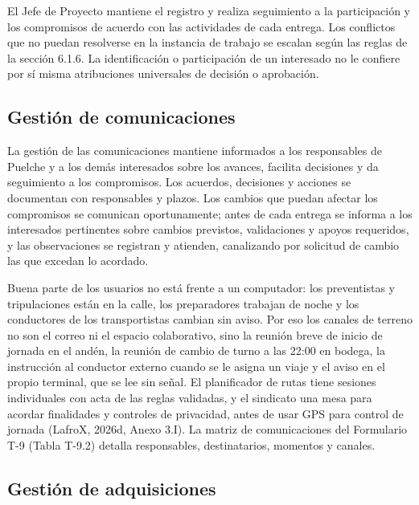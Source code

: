 El Jefe de Proyecto mantiene el registro y realiza seguimiento a la participación y los compromisos de acuerdo con las actividades de cada entrega. Los conflictos que no puedan resolverse en la instancia de trabajo se escalan según las reglas de la sección 6.1.6. La identificación o participación de un interesado no le confiere por sí misma atribuciones universales de decisión o aprobación.

\subsection{Gestión de comunicaciones}

La gestión de las comunicaciones mantiene informados a los responsables de Puelche y a los demás interesados sobre los avances, facilita decisiones y da seguimiento a los compromisos. Los acuerdos, decisiones y acciones se documentan con responsables y plazos. Los cambios que puedan afectar los compromisos se comunican oportunamente; antes de cada entrega se informa a los interesados pertinentes sobre cambios previstos, validaciones y apoyos requeridos, y las observaciones se registran y atienden, canalizando por solicitud de cambio las que excedan lo acordado.

Buena parte de los usuarios no está frente a un computador: los preventistas y tripulaciones están en la calle, los preparadores trabajan de noche y los conductores de los transportistas cambian sin aviso. Por eso los canales de terreno no son el correo ni el espacio colaborativo, sino la reunión breve de inicio de jornada en el andén, la reunión de cambio de turno a las 22:00 en bodega, la instrucción al conductor externo cuando se le asigna un viaje y el aviso en el propio terminal, que se lee sin señal. El planificador de rutas tiene sesiones individuales con acta de las reglas validadas, y el sindicato una mesa para acordar finalidades y controles de privacidad, antes de usar GPS para control de jornada (LafroX, 2026d, Anexo 3.I). La matriz de comunicaciones del Formulario T-9 (Tabla T-9.2) detalla responsables, destinatarios, momentos y canales.

\subsection{Gestión de adquisiciones}


